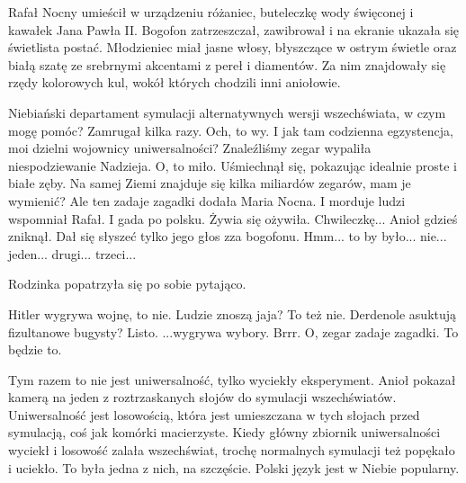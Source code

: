 Rafał Nocny umieścił w urządzeniu różaniec, buteleczkę wody święconej i kawałek Jana Pawła II.
Bogofon zatrzeszczał, zawibrował i na ekranie ukazała się świetlista postać.
Młodzieniec miał jasne włosy, błyszczące w ostrym świetle oraz białą szatę ze srebrnymi akcentami z pereł i diamentów.
Za nim znajdowały się rzędy kolorowych kul, wokół których chodzili inni aniołowie.
\begin{dialogue}
	\ds{} Niebiański departament symulacji alternatywnych wersji wszechświata, w czym mogę pomóc? \dm{} Zamrugał kilka razy.
		\dm{} Och, to wy. I jak tam codzienna egzystencja, moi dzielni wojownicy uniwersalności?
	\ds{} Znaleźliśmy zegar \dm{} wypaliła niespodziewanie Nadzieja.
	\ds{} O, to miło. \dm{} Uśmiechnął się, pokazując idealnie proste i białe zęby. \dm{} Na samej Ziemi znajduje się kilka miliardów zegarów, mam je wymienić?
	\ds{} Ale ten zadaje zagadki \dm{} dodała Maria Nocna.
	\ds{} I morduje ludzi \dm{} wspomniał Rafał.
	\ds{} I gada po polsku. \dm{} Żywia się ożywiła.
	\ds{} Chwileczkę... \dm{} Anioł gdzieś zniknął. Dał się słyszeć tylko jego głos zza bogofonu.
	\ds{} Hmm... to by było... nie... jeden... drugi... trzeci...
\end{dialogue}
Rodzinka popatrzyła się po sobie pytająco.
\begin{dialogue}
	\ds{} Hitler wygrywa wojnę, to nie.
	\ds{} Ludzie znoszą jaja? To też nie.
	\ds{} Derdenole asuktują fizultanowe bugysty? Listo.
	\ds{} ...wygrywa wybory. Brrr.
	\ds{} O, zegar zadaje zagadki. To będzie to.
\end{dialogue}
Tym razem to nie jest uniwersalność, tylko wyciekły eksperyment.
Anioł pokazał kamerą na jeden z roztrzaskanych słojów do symulacji wszechświatów.
Uniwersalność jest losowością, która jest umieszczana w tych słojach przed symulacją, coś jak komórki macierzyste.
Kiedy główny zbiornik uniwersalności wyciekł i losowość zalała wszechświat, trochę normalnych symulacji też popękało i uciekło.
To była jedna z nich, na szczęście. Polski język jest w Niebie popularny.
